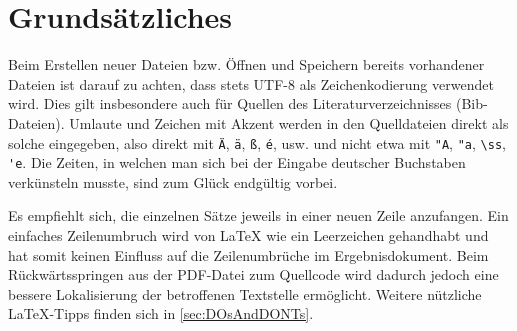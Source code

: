 \section[Grundsätzliches]{Grundsätzliches}%
\label{sec:Grundsätzliches}
%
%
Beim Erstellen neuer Dateien bzw. Öffnen und Speichern bereits vorhandener Dateien ist darauf zu achten,
dass stets UTF-8 als Zeichenkodierung verwendet wird.
Dies gilt insbesondere auch für Quellen des Literaturverzeichnisses (Bib-Dateien).
Umlaute und Zeichen mit Akzent werden in den Quelldateien direkt als solche eingegeben,
also direkt mit
\texttt{Ä},
\texttt{ä},
\texttt{ß},
\texttt{é},
usw. und nicht etwa mit
\verb+"A+,
\verb+"a+,
\verb+\ss+,
\verb+'e+.
Die Zeiten, in welchen man sich bei der Eingabe deutscher Buchstaben verkünsteln musste,
sind zum Glück endgültig vorbei.

Es empfiehlt sich, die einzelnen Sätze jeweils in einer neuen Zeile anzufangen.
Ein einfaches Zeilenumbruch wird von LaTeX wie ein Leerzeichen gehandhabt
und hat somit keinen Einfluss auf die Zeilenumbrüche im Ergebnisdokument.
Beim Rückwärtsspringen aus der PDF-Datei zum Quellcode wird dadurch jedoch
eine bessere Lokalisierung der betroffenen Textstelle ermöglicht.
Weitere nützliche \LaTeX-Tipps finden sich in \cref{sec:DOsAndDONTs}.